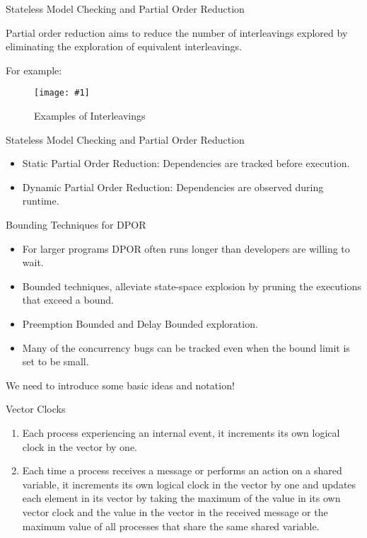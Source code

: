 \documentclass[9pt]{beamer}
\newcommand{\trace}[2]{
\begin{figure}[H]
\centering
\texttt{[image: \#1]}
\caption{#2}
\label{#2}
\end{figure}
}
\begin{document}
\begin{frame} {Stateless Model Checking and Partial Order Reduction}
 
    
Partial order reduction aims to reduce the number of interleavings explored by eliminating the exploration of
equivalent interleavings.

For example:
\trace{../img/interleavings}{Examples of Interleavings}

\end{frame}

\begin{frame}{Stateless Model Checking and Partial Order Reduction}

\begin{itemize}
\item Static Partial Order Reduction: Dependencies are tracked before execution.

\item Dynamic Partial Order Reduction: Dependencies are observed during runtime.
\end{itemize}

\end{frame}

\begin{frame}{Bounding Techniques for DPOR}

\begin{itemize}
\item For larger programs DPOR often runs longer than developers are willing to wait. 
\item Bounded techniques, alleviate state-space explosion by pruning the executions
that exceed a bound. 
\item Preemption Bounded and Delay Bounded exploration.
\item Many of the concurrency bugs can be tracked even when the bound limit is set to be small.
\end{itemize}
    
\end{frame}

\begin{frame}

We need to introduce some basic ideas and notation!
    
\end{frame}

\begin{frame}{Vector Clocks}

\begin{enumerate}
    \item Each process experiencing an internal event, it increments its own logical clock in the vector by one.
    \item Each time a process receives a message or performs an action on a shared variable, it increments its own
    logical clock in the vector by one and updates each element in its vector by taking the maximum of the value in its
    own vector clock and the value in the vector in the received message or the maximum value of all processes that
    share the same shared variable.
\end{enumerate}
    
\end{frame}
    
\end{document}
